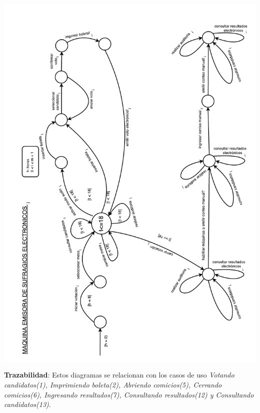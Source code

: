 \documentclass[spanish, 10pt,a4paper]{article}
\numberwithin{equation}{section} %
\begin{document}
\vspace{\baselineskip}
    \begin{center}
                \includegraphics[scale=0.75, page=1]{imagenes/fsm/FSMMaquinaEmisoradeSufragios.pdf}
                \\
                \vspace{1pt}
                \footnotesize\textit{}
        \end{center}
\vspace{\baselineskip}
\vspace{-10px}
\noindent\textbf{Trazabilidad}: Estos diagramas se relacionan con los casos de uso \textit{Votando candidatos(1), Imprimiendo boleta(2), Abriendo comicios(5), Cerrando comicios(6), Ingresando resultados(7), Consultando resultados(12) y Consultando candidatos(13)}.\\
\end{document}
